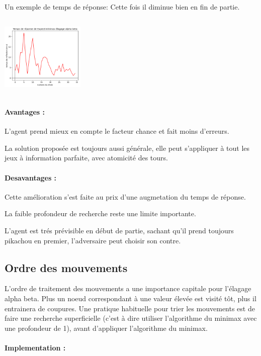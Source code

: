 			    Un exemple de temps de réponse: Cette fois il diminue bien en fin de partie.
                
                \includegraphics[width=4cm,height=4cm]{graphiques/temps_alphbet2_alphabet1}
            \paragraph{Avantages :}
                L'agent prend mieux en compte le facteur chance et fait moins d'erreurs.
                
                La solution proposée est toujours aussi générale, elle peut s'appliquer à tout les jeux à information parfaite, avec atomicité des tours.
            
            \paragraph{Desavantages :}
                Cette amélioration s'est faite au prix d'une augmetation du temps de réponse. 
                
                La faible profondeur de recherche reste une limite importante.
                
                L'agent est trés prévisible en début de partie, sachant qu'il prend toujours pikachou en premier, l'adversaire peut choisir son contre.
                
        \subsection{Ordre des mouvements}
            L'ordre de traitement des mouvements a une importance capitale pour l'élagage alpha beta. Plus un noeud correspondant à une valeur élevée est visité tôt, plus il entrainera de coupures.
            Une pratique habituelle pour trier les mouvements est de faire une recherche superficielle (c'est à dire utiliser l'algorithme du minimax avec une profondeur de 1), avant d'appliquer l'algorithme du minimax.
            \paragraph{Implementation :}
                
